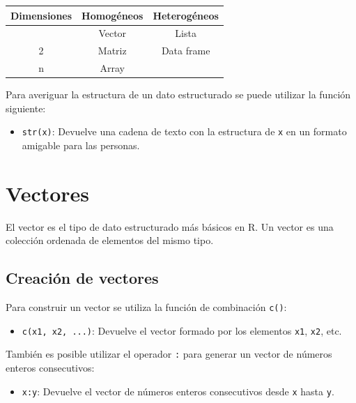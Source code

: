 \documentclass[
  a4paper,
]{scrreport}
\providecommand{\tightlist}{%
  \setlength{\itemsep}{0pt}\setlength{\parskip}{0pt}}\usepackage{longtable,booktabs,array}
\theoremstyle{definition}
\theoremstyle{definition}
\theoremstyle{remark}
\begin{document}
\begin{longtable}[]{@{}ccc@{}}
\toprule\noalign{}
Dimensiones & Homogéneos & Heterogéneos \\
\midrule\noalign{}
\endhead
\bottomrule\noalign{}
\endlastfoot
1 & Vector & Lista \\
2 & Matriz & Data frame \\
n & Array & \\
\end{longtable}

Para averiguar la estructura de un dato estructurado se puede utilizar
la función siguiente:

\begin{itemize}
\tightlist
\item
  \texttt{str(x)}: Devuelve una cadena de texto con la estructura de
  \texttt{x} en un formato amigable para las personas.
\end{itemize}

\hypertarget{vectores}{%
\section{Vectores}\label{vectores}}

El vector es el tipo de dato estructurado más básicos en R. Un vector es
una colección ordenada de elementos del mismo tipo.

\hypertarget{creaciuxf3n-de-vectores}{%
\subsection{Creación de vectores}\label{creaciuxf3n-de-vectores}}

Para construir un vector se utiliza la función de combinación
\texttt{c()}:

\begin{itemize}
\tightlist
\item
  \texttt{c(x1,\ x2,\ ...)}: Devuelve el vector formado por los
  elementos \texttt{x1}, \texttt{x2}, etc.
\end{itemize}

También es posible utilizar el operador \texttt{:} para generar un
vector de números enteros consecutivos:

\begin{itemize}
\tightlist
\item
  \texttt{x:y}: Devuelve el vector de números enteros consecutivos desde
  \texttt{x} hasta \texttt{y}.
\end{itemize}
\end{document}
